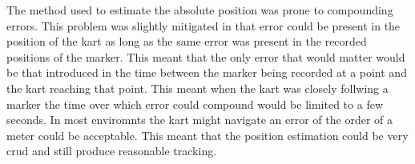 The method used to estimate the absolute position was prone to compounding errors. This problem was slightly mitigated in that error could be present in the position of the kart as long as the same error was present in the recorded positions of the marker. This meant that the only error that would matter would be that introduced in the time between the marker being recorded at a point and the kart reaching that point. This meant when the kart was closely follwing a marker the time over which error could compound would be limited to a few seconds. In most enviromnts the kart might navigate an error of the order of a meter could be acceptable. This meant that the position estimation could be very crud and still produce reasonable tracking.